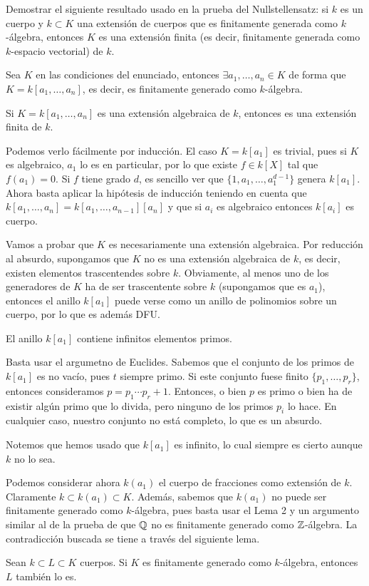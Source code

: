 \documentclass[twoside]{article}
\begin{document}
\newpage

\begin{ejercicio}{2} Demostrar el siguiente resultado usado en la prueba del Nullstellensatz: si $k$ es un cuerpo y $k \subset K$ una extensión de cuerpos que es finitamente generada como $k$-álgebra, entonces $K$ es una extensión finita (es decir, finitamente generada como $k$-espacio vectorial) de $k$.
\begin{solucion}
Sea $K$ en las condiciones del enunciado, entonces $\exists a_1,\dotsc,a_n \in K$ de forma que $K=k[a_1,\dotsc,a_n]$, es decir, es finitamente generado como $k$-álgebra. 
\begin{lemma} Si $K=k[a_1,\dotsc,a_n]$ es una extensión algebraica de $k$, entonces es una extensión finita de $k$.
\end{lemma}
\begin{dem}
Podemos verlo fácilmente por inducción. El caso $K=k[a_1]$ es trivial, pues si $K$ es algebraico, $a_1$ lo es en particular, por lo que existe $f\in k[X]$ tal que $f(a_1)=0$. Si $f$ tiene grado $d$, es sencillo ver que $\{1,a_1,\dotsc,a_1^{d-1}\}$ genera $k[a_1]$. Ahora basta aplicar la hipótesis de inducción teniendo en cuenta que $k[a_1,\dotsc,a_n]=k[a_1,\dotsc,a_{n-1}][a_n]$ y que si $a_i$ es algebraico entonces $k[a_i]$ es cuerpo.
\end{dem}

Vamos a probar que $K$ es necesariamente una extensión algebraica. Por reducción al absurdo, supongamos que $K$ no es una extensión algebraica de $k$, es decir, existen elementos trascentendes sobre $k$. Obviamente, al menos uno de los generadores de $K$ ha de ser trascentente sobre $k$ (supongamos que es $a_1$), entonces el anillo $k[a_1]$ puede verse como un anillo de polinomios sobre un cuerpo, por lo que es además DFU.

\begin{lemma}El anillo $k[a_1]$ contiene infinitos elementos primos.
\end{lemma}
\begin{dem}
Basta usar el argumetno de Euclides. Sabemos que el conjunto de los primos de $k[a_1]$ es no vacío, pues $t$ siempre primo. Si este conjunto fuese finito $\{p_1,\dotsc,p_r\}$, entonces consideramos $p=p_1\cdots p_r +1$. Entonces, o bien $p$ es primo o bien ha de existir algún primo que lo divida, pero ninguno de los primos $p_i$ lo hace. En cualquier caso, nuestro conjunto no está completo, lo que es un absurdo.

Notemos que hemos usado que $k[a_1]$ es infinito, lo cual siempre es cierto aunque $k$ no lo sea.
\end{dem}
Podemos considerar ahora $k(a_1)$ el cuerpo de fracciones como extensión de $k$. Claramente $k\subset k(a_1)\subset K$. Además, sabemos que $k(a_1)$ no puede ser finitamente generado como $k$-álgebra, pues basta usar el Lema 2 y un argumento similar al de la prueba de que $\mathbb{Q}$ no es finitamente generado como $\mathbb{Z}$-álgebra. La contradicción buscada se tiene a través del siguiente lema.
\begin{lemma} Sean $k \subset L \subset K$ cuerpos. Si $K$ es finitamente generado como $k$-álgebra, entonces $L$ también lo es.
\end{lemma}


\end{solucion}
\end{ejercicio}
\end{document}
